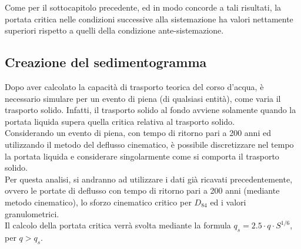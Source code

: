 Come per il sottocapitolo precedente, ed in modo concorde a tali risultati, la portata critica nelle condizioni successive alla sistemazione ha valori nettamente superiori rispetto a quelli della condizione ante-sistemazione.

\subsection{Creazione del sedimentogramma}
Dopo aver calcolato la capacità di trasporto teorica del corso d'acqua, è necessario simulare per un evento di piena (di qualsiasi entità), come varia il trasporto solido. Infatti, il trasporto solido al fondo avviene solamente quando la portata liquida supera quella critica relativa al trasporto solido.\\
Considerando un evento di piena, con tempo di ritorno pari a 200 anni ed utilizzando il metodo del deflusso cinematico, è possibile discretizzare nel tempo la portata liquida e considerare singolarmente come si comporta il trasporto solido.\\
Per questa analisi, si andranno ad utilizzare i dati già ricavati precedentemente, ovvero le portate di deflusso con tempo di ritorno pari a 200 anni (mediante metodo cinematico), lo sforzo cinematico critico per $D_{84}$ ed i valori granulometrici.\\
Il calcolo della portata critica verrà svolta mediante la formula $q_s=2.5 \cdot q \cdot S^{1/6}$, per $q > q_s$.

